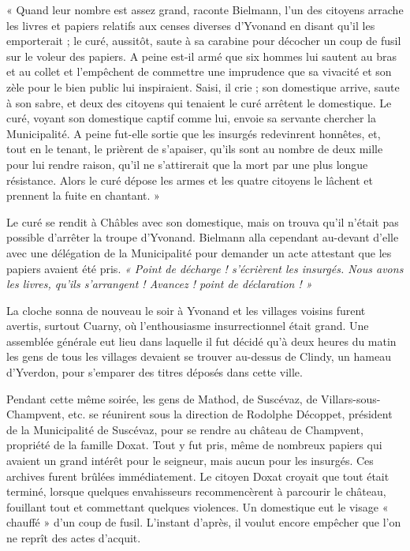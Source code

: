 \documentclass[french,twoside]{book} %
\newenvironment{quoteblock}%
  {\begin{quoting}}
  {\end{quoting}}
\newenvironment{quotebar}{%
    \def\FrameCommand{{\color{rubric!10!}\vrule width 0.5em} \hspace{0.9em}}%
    \def\OuterFrameSep{\itemsep} %
    \MakeFramed {\advance\hsize-\width \FrameRestore}
  }%
  {%
    \endMakeFramed
  }
\renewenvironment{quoteblock}%
  {%
    \savenotes
    \setstretch{0.9}
    \begin{quotebar}
  }
  {%
    \end{quotebar}
    \spewnotes
  }
\begin{document}
\begin{quoteblock}
 \noindent « Quand leur nombre est assez grand, raconte Bielmann, l’un des citoyens arrache les livres et papiers relatifs aux censes diverses d’Yvonand en disant qu’il les emporterait ; le curé, aussitôt, saute à sa carabine pour décocher un coup de fusil sur le voleur des papiers. A peine est-il armé que six hommes lui sautent au bras et au collet et l’empêchent de commettre une imprudence que sa vivacité et son zèle pour le bien public lui inspiraient. Saisi, il crie ; son domestique arrive, saute à son sabre, et deux des citoyens qui tenaient le curé arrêtent le domestique. Le curé, voyant son domestique captif comme lui, envoie sa servante chercher la Municipalité. A peine fut-elle sortie que les insurgés redevinrent honnêtes, et, tout en le tenant, le prièrent de s’apaiser, qu’ils sont au nombre de deux mille pour lui rendre raison, qu’il ne s’attirerait que la mort par une plus longue résistance. Alors le curé dépose les armes et les quatre citoyens le lâchent et prennent la fuite en chantant. »
 \end{quoteblock}

\noindent Le curé se rendit à Châbles avec son domestique, mais on trouva qu’il n’était pas possible d’arrêter la troupe d’Yvonand. Bielmann alla cependant au-devant d’elle avec une délégation de la Municipalité pour demander un acte attestant que les papiers avaient été pris. \emph{« Point de décharge ! s’écrièrent les insurgés. Nous avons les livres, qu’ils s’arrangent ! Avancez ! point de déclaration ! »}\par
La cloche sonna de nouveau le soir à Yvonand et les villages voisins furent avertis, surtout Cuarny, où l’enthousiasme insurrectionnel était grand. Une assemblée générale eut lieu dans laquelle il fut décidé qu’à deux heures du matin les gens de tous les villages devaient se trouver au-dessus de Clindy, un hameau d’Yverdon, pour s’emparer des titres déposés dans cette ville.\par
Pendant cette même soirée, les gens de Mathod, de Suscévaz, de Villars-sous-Champvent, etc. se réunirent sous la direction de Rodolphe Décoppet, président de la Municipalité de Suscévaz, pour se rendre au château de Champvent, propriété de la famille Doxat. Tout y fut pris, même de nombreux papiers qui avaient un grand intérêt pour le seigneur, mais aucun pour les insurgés. Ces archives furent brûlées immédiatement. Le citoyen Doxat croyait que tout était terminé, lorsque quelques envahisseurs recommencèrent à parcourir le château, fouillant tout et commettant quelques violences. Un domestique eut le visage « chauffé » d’un coup de fusil. L’instant d’après, il voulut encore empêcher que l’on ne reprît des actes d’acquit.\par
\end{document}
